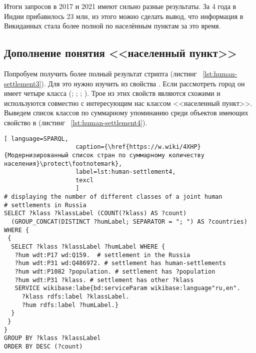 Итоги запросов в 2017 и 2021 имеют сильно разные результаты. За 4 года в Индии прибавилось 23 млн, из этого можно сделать вывод, что информация в Викиданных стала более полной по населённым пунктам за это время.

\subsection{Дополнение понятия <<населенный пункт>>}

Попробуем получить более полный результат стрипта (листинг ~\protect\ref{lst:human-settlement3}). Для это нужно изучить  из свойства . Если рассмотреть город  он имеет четыре класса (; ; ; ). Трое из этих свойств являются схожими и используются совместно с интересующим нас классом <<населенный пункт>>. Выведем список классов по суммарному упоминанию среди объектов имеющих свойство  в  (листинг ~\protect\ref{lst:human-settlement4}).

\begin{lstlisting}[ language=SPARQL, 
                    caption={\href{https://w.wiki/4XHP}{Модернизированный список стран по суммарному количеству населения}\protect\footnotemark},
                    label=lst:human-settlement4,
                    texcl 
                    ]
# displaying the number of different classes of a joint human 
# settlements in Russia
SELECT ?klass ?klassLabel (COUNT(?klass) AS ?count) 
  (GROUP_CONCAT(DISTINCT ?humLabel; SEPARATOR = "; ") AS ?countries) 
WHERE {
 {
  SELECT ?klass ?klassLabel ?humLabel WHERE {
   ?hum wdt:P17 wd:Q159.  # settlement in the Russia
   ?hum wdt:P31 wd:Q486972. # settlement has human-settlements
   ?hum wdt:P1082 ?population. # settlement has ?population
   ?hum wdt:P31 ?klass. # settlement has other ?klass
   SERVICE wikibase:labe{bd:serviceParam wikibase:language"ru,en".
     ?klass rdfs:label ?klassLabel.
     ?hum rdfs:label ?humLabel.}
  }
 }
}
GROUP BY ?klass ?klassLabel
ORDER BY DESC (?count)
\end{lstlisting}%

